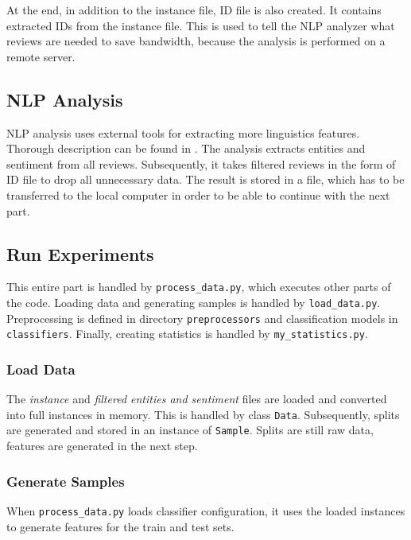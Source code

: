 At the end, in addition to the instance file, ID file is also created.
It contains extracted IDs from the instance file.
This is used to tell the NLP analyzer what reviews are needed to save bandwidth,
because the analysis is performed on a remote server.

\subsection{NLP Analysis}

NLP analysis uses external tools for extracting more linguistics features.
Thorough description can be found in .
The analysis extracts entities and sentiment from all reviews.
Subsequently, it takes filtered reviews in the form of ID file to drop all unnecessary data.
The result is stored in a file, which has to be transferred to the local computer in order to be able to continue with the next part.





\subsection{Run Experiments}

This entire part is handled by \texttt{process\_data.py}, which executes other parts of the code.
Loading data and generating samples is handled by \texttt{load\_data.py}.
Preprocessing is defined in directory \texttt{preprocessors} and classification models in \texttt{classifiers}.
Finally, creating statistics is handled by \texttt{my\_statistics.py}.


\subsubsection{Load Data}

The \textit{instance} and \textit{filtered entities and sentiment} files are loaded and
converted into full instances in memory.
This is handled by class \texttt{Data}.
Subsequently, splits are generated and stored in an instance of \texttt{Sample}.
Splits are still raw data, features are generated in the next step.

\subsubsection{Generate Samples}

When \texttt{process\_data.py} loads classifier configuration,
it uses the loaded instances to generate features for the train and test sets.

